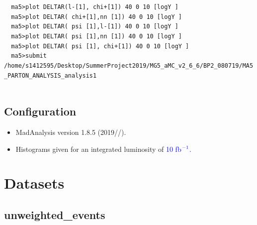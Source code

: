 \documentclass[a4paper, 10pt]{article}
\begin{document}
\texttt{ }\texttt{ }\texttt{ma5>plot DELTAR(l-[1],~chi+[1]) 40 0 10 [logY ]\\
}
\texttt{ }\texttt{ }\texttt{ma5>plot DELTAR(~chi+[1],nn~[1]) 40 0 10 [logY ]\\
}
\texttt{ }\texttt{ }\texttt{ma5>plot DELTAR(~psi~[1],l-[1]) 40 0 10 [logY ]\\
}
\texttt{ }\texttt{ }\texttt{ma5>plot DELTAR(~psi~[1],nn~[1]) 40 0 10 [logY ]\\
}
\texttt{ }\texttt{ }\texttt{ma5>plot DELTAR(~psi~[1],~chi+[1]) 40 0 10 [logY ]\\
}
\texttt{ }\texttt{ }\texttt{ma5>submit /\-home/\-s1412595/\-Desktop/\-SummerProject2019/\-MG5\_aMC\_v2\_6\_6/\-BP2\_080719/\-MA5\_PARTON\_ANALYSIS\_analysis1\\
}
\texttt{ }\texttt{ }\subsection{ Configuration}

\begin{itemize}
  \item MadAnalysis version 1.8.5 (2019//).
   \item Histograms given for an integrated luminosity of \textcolor{blue}{10}\textcolor{blue}{ fb}$^{\textcolor{blue}{-1}}$\textcolor{blue}{.}
\textcolor{blue}{}
\end{itemize}
\newpage
\section{ Datasets}

\subsection{ unweighted\_events}
\end{document}
